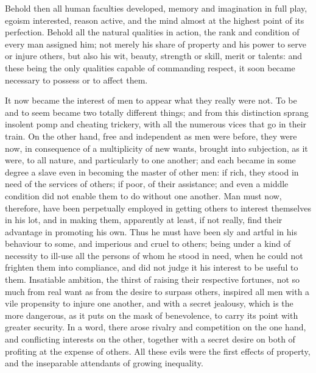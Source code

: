 \documentclass[12pt]{report}
\begin{document}
Behold then all human faculties developed, memory and imagination in full play, egoism interested, reason active, and the mind almost at the highest point of its perfection. Behold all the natural qualities in action, the rank and condition of every man assigned him; not merely his share of property and his power to serve or injure others, but also his wit, beauty, strength or skill, merit or talents: and these being the only qualities capable of commanding respect, it soon became necessary to possess or to affect them.

It now became the interest of men to appear what they really were not. To be and to seem became two totally different things; and from this distinction sprang insolent pomp and cheating trickery, with all the numerous vices that go in their train. On the other hand, free and independent as men were before, they were now, in consequence of a multiplicity of new wants, brought into subjection, as it were, to all nature, and particularly to one another; and each became in some degree a slave even in becoming the master of other men: if rich, they stood in need of the services of others; if poor, of their assistance; and even a middle condition did not enable them to do without one another. Man must now, therefore, have been perpetually employed in getting others to interest themselves in his lot, and in making them, apparently at least, if not really, find their advantage in promoting his own. Thus he must have been sly and artful in his behaviour to some, and imperious and cruel to others; being under a kind of necessity to ill-use all the persons of whom he stood in need, when he could not frighten them into compliance, and did not judge it his interest to be useful to them. Insatiable ambition, the thirst of raising their respective fortunes, not so much from real want as from the desire to surpass others, inspired all men with a vile propensity to injure one another, and with a secret jealousy, which is the more dangerous, as it puts on the mask of benevolence, to carry its point with greater security. In a word, there arose rivalry and competition on the one hand, and conflicting interests on the other, together with a secret desire on both of profiting at the expense of others. All these evils were the first effects of property, and the inseparable attendants of growing inequality.
\end{document}
